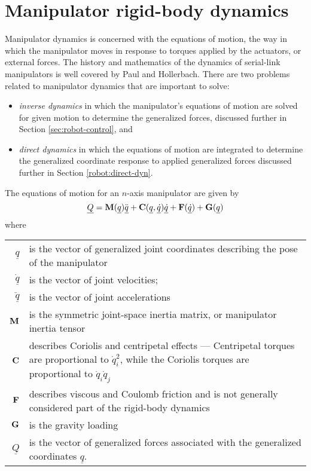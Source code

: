 \documentclass{article}
\newcommand{\DEF}[1]{{\it#1}}
\renewcommand{\vec}[1]{\underline{#1}}
\begin{document}
\section{Manipulator rigid-body dynamics}  \label{sec:robot-rigid-body}
Manipulator dynamics is concerned with the equations of motion, the way
in which the manipulator moves in response to torques applied by the actuators,
or external forces.
The history and mathematics of the dynamics of serial-link
manipulators is well covered by Paul\cite{Paul81a} and
Hollerbach\cite{Hollerbach82}.
There are two problems related to manipulator dynamics that are important to solve:
\begin{itemize}
\item \DEF{inverse dynamics} in which the manipulator's equations of motion  are
solved for given motion to determine the generalized forces, discussed 
further in Section \ref{sec:robot-control}, and
\item \DEF{direct dynamics} in which the equations of motion are integrated to determine
the generalized coordinate response to applied generalized forces discussed further
in Section \ref{robot:direct-dyn}.
\end{itemize}
The equations of motion for an $n$-axis manipulator are given by
\begin{equation}
\vec{Q} =
{\bf M}(\vec{q})\ddot{\vec{q}} + {\bf
C}(\vec{q},\vec{\dot{q}}) \vec{\dot{q}} +
{\bf F}(\vec{\dot{q}}) + {\bf G}(\vec{q}) \label{eq:inv-dyn}
\end{equation}
where

\begin{tabular}{r p{5in}}
$\vec{q}$ & is the vector of generalized joint coordinates describing
the pose of the manipulator\\
$\vec{\dot{q}}$ & is the vector of joint velocities;      \\
$\vec{\ddot{q}}$ & is the vector of joint accelerations   \\
$\bf M$ & is the symmetric joint-space inertia matrix, or manipulator inertia
tensor\\
$\bf C$ & describes Coriolis and centripetal effects --- Centripetal torques are
proportional to $\dot{q}_i^2$, while the Coriolis torques are proportional
to $\dot{q}_i \dot{q}_j$\\
$\bf F$ & describes viscous and Coulomb friction and is not generally considered
part of the rigid-body dynamics\\
$\bf G$ & is the gravity loading\\
$\vec{Q}$ & is the vector of generalized forces associated with the
generalized coordinates $\vec{q}$.
\end{tabular}
\end{document}
